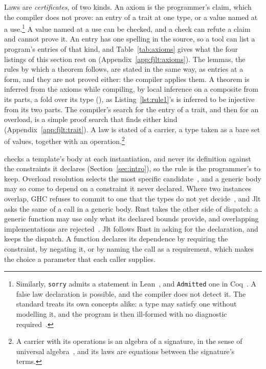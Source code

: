 Laws are \emph{certificates}, of two kinds.
An axiom is the programmer's claim, which the compiler does not prove: an entry of a trait at one type, or a value named at a use.\footnote{Similarly, \texttt{sorry} admits a statement in Lean~\cite{demoura2021lean}, and \texttt{Admitted} one in Coq~\cite{Coq}.
A false law declaration is possible, and the compiler does not detect it.
The standard treats its own concepts alike: a type may satisfy one without modelling it, and the program is then ill-formed with no diagnostic required~\cite[{\texttt{res.on.requirements}}]{cpp23standard}.}
A value named at a use can be checked, and a check can refute a claim and cannot prove it.
An entry has one spelling in the source, so a tool can list a program's entries of that kind, and Table~\ref{tab:axioms} gives what the four listings of this section rest on (Appendix~\ref{app:fjlt:axioms}).
The lemmas, the rules by which a theorem follows, are stated in the same way, as entries at a form, and they are not proved either: the compiler applies them.
A theorem is inferred from the axioms while compiling, by local inference on a composite from its parts, a fold over its type (\RuleThree{}), as Listing~\ref{lst:rule1}'s  is inferred to be injective from its two parts.
The compiler's search for the entry of a trait, and then for an overload, is a simple proof search that finds either kind~\cite{augustsson2005djinn} (Appendix~\ref{app:fjlt:trait}).
A law is stated of a carrier, a type taken as a bare set of values, together with an operation.\footnote{A carrier with its operations is an algebra of a signature, in the sense of universal algebra~\cite{birkhoff1935structure,burris1981universalalgebra}, and its laws are equations between the signature's terms.}

 checks a template's body at each instantiation, and never its definition against the constraints it declares (Section~\ref{sec:intro}), so the rule is the programmer's to keep.
Overload resolution selects the most specific candidate~\cite{cpp23standard}, and a generic body may so come to depend on a constraint it never declared.
Where two instances overlap, GHC refuses to commit to one that the types do not yet decide~\cite{ghc2024overlapping}, and Jlt asks the same of a call in a generic body.
Rust takes the other side of dispatch: a generic function may use only what its declared bounds provide, and overlapping implementations are rejected~\cite{rustreference}.
Jlt follows Rust in asking for the declaration, and keeps the dispatch.
A function declares its dependence by requiring the constraint, by negating it, or by naming the call as a requirement, which makes the choice a parameter that each caller supplies.

